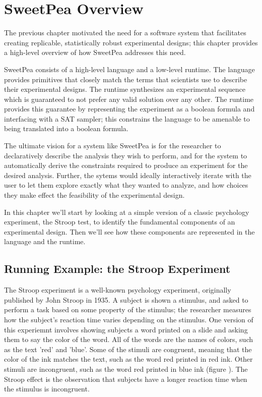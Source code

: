 
\chapter{SweetPea Overview}

The previous chapter motivated the need for a software system that facilitates creating replicable, statistically robust experimental designs; this chapter provides a high-level overview of how SweetPea addresses this need.

SweetPea consists of a high-level language and a low-level runtime. The language provides primitives that closely match the terms that scientists use to describe their experimental designs. The runtime synthesizes an experimental sequence which is guaranteed to not prefer any valid solution over any other. The runtime provides this guarantee by representing the experiment as a boolean formula and interfacing with a SAT sampler; this constrains the language to be amenable to being translated into a boolean formula.

The ultimate vision for a system like SweetPea is for the researcher to declaratively describe the analysis they wish to perform, and for the system to automatically derive the constraints required to produce an experiment for the desired analysis. Further, the sytems would ideally interactively iterate with the user to let them explore exactly what they wanted to analyze, and how choices they make effect the feasibility of the experimental design.

In this chapter we'll start by looking at a simple version of a classic psychology experiment, the Stroop test, to identify the fundamental components of an experimental design. Then we'll see how these components are represented in the language and the runtime.

\section{Running Example: the Stroop Experiment}

The Stroop experiment is a well-known psychology experiment, originally published by John Stroop in 1935. A subject is shown a stimulus, and asked to perform a task based on some property of the stimulus; the researcher measures how the subject's reaction time varies depending on the stimulus. One version of this experiemnt involves showing subjects a word printed on a slide and asking them to say the color of the word. All of the words are the names of colors, such as the text 'red' and 'blue'. Some of the stimuli are congruent, meaning that the color of the ink matches the text, such as the word red printed in red ink. Other stimuli are incongruent, such as the word red printed in blue ink (figure ). The Stroop effect is the observation that subjects have a longer reaction time when the stimulus is incongruent.

